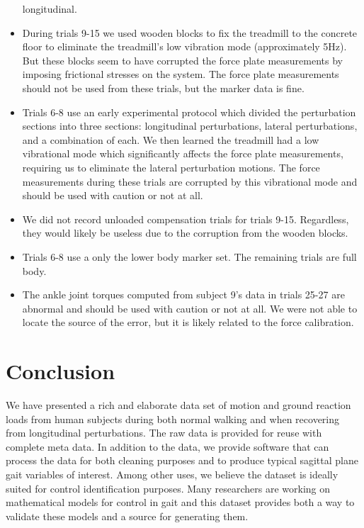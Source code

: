 \documentclass[fleqn,12pt]{wlpeerj}
\begin{document}
\begin{itemize}
    longitudinal.
  \item During trials 9-15 we used wooden blocks to fix the treadmill to the
    concrete floor to eliminate the treadmill's low vibration mode
    (approximately 5\si{\hertz}). But these blocks seem to have corrupted the
    force plate measurements by imposing frictional stresses on the system. The
    force plate measurements should not be used from these trials, but the
    marker data is fine.
  \item Trials 6-8 use an early experimental protocol which divided the
    perturbation sections into three sections: longitudinal perturbations,
    lateral perturbations, and a combination of each. We then learned the
    treadmill had a low vibrational mode which significantly affects the force
    plate measurements, requiring us to eliminate the lateral perturbation
    motions. The force measurements during these trials are corrupted by this
    vibrational mode and should be used with caution or not at all.
  \item We did not record unloaded compensation trials for trials 9-15.
    Regardless, they would likely be useless due to the corruption from the
    wooden blocks.
  \item Trials 6-8 use a only the lower body marker set. The remaining trials
    are full body.
  \item The ankle joint torques computed from subject 9's data in trials 25-27
    are abnormal and should be used with caution or not at all. We were not
    able to locate the source of the error, but it is likely related to the
    force calibration.
\end{itemize}

\section*{Conclusion}
%
We have presented a rich and elaborate data set of motion and ground reaction
loads from human subjects during both normal walking and when recovering from
longitudinal perturbations. The raw data is provided for reuse with complete
meta data. In addition to the data, we provide software that can process the
data for both cleaning purposes and to produce typical sagittal plane gait
variables of interest. Among other uses, we believe the dataset is ideally
suited for control identification purposes. Many researchers are working on
mathematical models for control in gait and this dataset provides both a way to
validate these models and a source for generating them.
\end{document}
